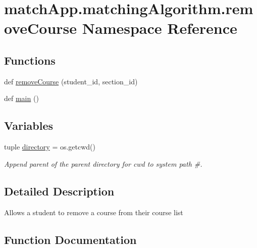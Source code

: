 \hypertarget{namespacematch_app_1_1matching_algorithm_1_1remove_course}{}\section{match\+App.\+matching\+Algorithm.\+remove\+Course Namespace Reference}
\label{namespacematch_app_1_1matching_algorithm_1_1remove_course}
\subsection*{Functions}
\begin{DoxyCompactItemize}
\item 
def \hyperlink{namespacematch_app_1_1matching_algorithm_1_1remove_course_a9a2e3e0779b66af2a4524c9ce6fb4805}{remove\+Course} (student\+\_\+id, section\+\_\+id)
\item 
def \hyperlink{namespacematch_app_1_1matching_algorithm_1_1remove_course_a7d407f5ed0323430f9118d99eedc2b82}{main} ()
\end{DoxyCompactItemize}
\subsection*{Variables}
\begin{DoxyCompactItemize}
\item 
tuple \hyperlink{namespacematch_app_1_1matching_algorithm_1_1remove_course_a237ee35261564a309048c0accda15623}{directory} = os.\+getcwd()
\begin{DoxyCompactList}\small\item\em Append parent of the parent directory for cwd to system path \#. \end{DoxyCompactList}\end{DoxyCompactItemize}


\subsection{Detailed Description}
\begin{DoxyVerb}Allows a student to remove a course from their course list\end{DoxyVerb}
 

\subsection{Function Documentation}
\hypertarget{namespacematch_app_1_1matching_algorithm_1_1remove_course_a7d407f5ed0323430f9118d99eedc2b82}{}
